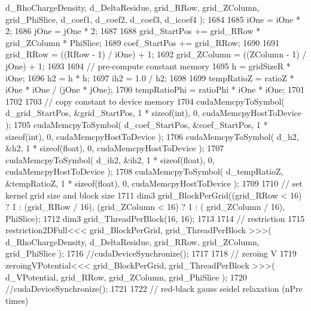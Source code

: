 \begin{DoxyCode}
      d\_RhoChargeDensity, d\_DeltaResidue, grid\_RRow, grid\_ZColumn, grid\_PhiSlice, d\_coef1, d\_coef2, d\_coef3, d\_icoef4 );
1684                 
1685             iOne = iOne * 2; 
1686             jOne = jOne * 2;
1687 
1688             grid\_StartPos += grid\_RRow * grid\_ZColumn * PhiSlice;
1689             coef\_StartPos += grid\_RRow;
1690 
1691             grid\_RRow       = ((RRow - 1) / iOne) + 1;
1692             grid\_ZColumn    = ((ZColumn - 1) / jOne) + 1;
1693 
1694             \textcolor{comment}{// pre-compute constant memory}
1695             h   = gridSizeR * iOne;
1696             h2  = h * h;
1697             ih2 = 1.0 / h2;
1698 
1699             tempRatioZ = ratioZ * iOne * iOne / (jOne * jOne);
1700             tempRatioPhi = ratioPhi * iOne * iOne;
1701 
1702 
1703             \textcolor{comment}{// copy constant to device memory}
1704             cudaMemcpyToSymbol( d\_grid\_StartPos, &grid\_StartPos, 1 * \textcolor{keyword}{sizeof}(\textcolor{keywordtype}{int}), 0, cudaMemcpyHostToDevice
       );
1705             cudaMemcpyToSymbol( d\_coef\_StartPos, &coef\_StartPos, 1 * \textcolor{keyword}{sizeof}(\textcolor{keywordtype}{int}), 0, cudaMemcpyHostToDevice
       );
1706             cudaMemcpyToSymbol( d\_h2, &h2, 1 * \textcolor{keyword}{sizeof}(\textcolor{keywordtype}{float}), 0, cudaMemcpyHostToDevice );
1707             cudaMemcpyToSymbol( d\_ih2, &ih2, 1 * \textcolor{keyword}{sizeof}(\textcolor{keywordtype}{float}), 0, cudaMemcpyHostToDevice );
1708             cudaMemcpyToSymbol( d\_tempRatioZ, &tempRatioZ, 1 * \textcolor{keyword}{sizeof}(\textcolor{keywordtype}{float}), 0, cudaMemcpyHostToDevice );
1709 
1710             \textcolor{comment}{// set kernel grid size and block size}
1711             dim3 grid\_BlockPerGrid((grid\_RRow < 16) ? 1 : (grid\_RRow / 16), (grid\_ZColumn < 16) ? 1 : (
      grid\_ZColumn / 16), PhiSlice);
1712             dim3 grid\_ThreadPerBlock(16, 16);
1713 
1714             \textcolor{comment}{// restriction}
1715             restriction2DFull<<< grid\_BlockPerGrid, grid\_ThreadPerBlock >>>( d\_RhoChargeDensity, 
      d\_DeltaResidue, grid\_RRow, grid\_ZColumn, grid\_PhiSlice );
1716             \textcolor{comment}{//cudaDeviceSynchronize();}
1717 
1718             \textcolor{comment}{// zeroing V}
1719             zeroingVPotential<<< grid\_BlockPerGrid, grid\_ThreadPerBlock >>>( d\_VPotential, grid\_RRow, 
      grid\_ZColumn, grid\_PhiSlice );
1720             \textcolor{comment}{//cudaDeviceSynchronize();}
1721 
1722             \textcolor{comment}{// red-black gauss seidel relaxation (nPre times)}

\end{DoxyCode}
